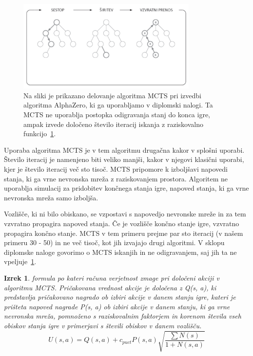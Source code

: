 \documentclass[a4paper, 12pt]{book}
\newtheorem{izrek}{Izrek}[chapter]
\begin{document}
\begin{figure}[h]
	\begin{center}
		\includegraphics[width=0.8\textwidth]{photos/modifiedMCTS.pdf}
	\end{center}
	\caption{Na sliki je prikazano delovanje algoritma MCTS pri izvedbi algoritma AlphaZero, ki ga uporabljamo v diplomski nalogi. Ta MCTS ne uporablja postopka odigravanja stanj do konca igre, ampak izvede določeno število iteracij iskanja z raziskovalno funkcijo~\ref{iz:1}. }
	\label{modifiedMCTS}
\end{figure}

Uporaba algoritma MCTS je v tem algoritmu drugačna kakor v splošni uporabi.
Število iteracij je namenjeno biti veliko manjši, kakor v njegovi klasični uporabi, kjer je število iteracij več sto tisoč. 
MCTS pripomore k izboljšavi napovedi stanja, ki ga vrne nevronska mreža z raziskovanjem prostora.
Algoritem ne uporablja simulacij za pridobitev končnega stanja igre, napoved stanja, ki ga vrne nevronska mreža samo izboljša.

Vozlišče, ki ni bilo obiskano, se vzpostavi s napovedjo nevronske mreže in za tem vzvratno propagira napoved stanja.
Če je vozlišče končno stanje igre, vzvratno propagira končno stanje.
MCTS v tem primeru prejme par sto iteracij (v našem primeru 30 - 50) in ne več tisoč, kot jih izvajajo drugi algoritmi.
V sklopu diplomske naloge govorimo o MCTS iskanjih in ne odigravanjem, saj jih ta ne vpeljuje~\ref{modifiedMCTS}.


\begin{izrek}
	\label{iz:1}
	formula po kateri računa verjetnost zmage pri določeni akciji v algoritmu MCTS. Pričakovana vrednost akcije je določena z Q(s, a), ki predstavlja  pričakovano nagrado ob izbiri akcije v danem stanju igre, kateri je prišteta napoved nagrade P(s, a) ob izbiri akcije v danem stanju, ki ga vrne nevronska mreža, pomnoženo s raziskovalnim faktorjem in korenom števila vseh obiskov stanja igre v primerjavi s števili obiskov v danem vozlišču.
	\begin{equation}
	U(s, a) = Q(s, a) + c_{puct}P(s, a)\sqrt{\dfrac{\sum{N(s)}}{1+N(s, a)}}
	\label{eq:mctsFormula}
	\end{equation}
\end{izrek}
\end{document}
